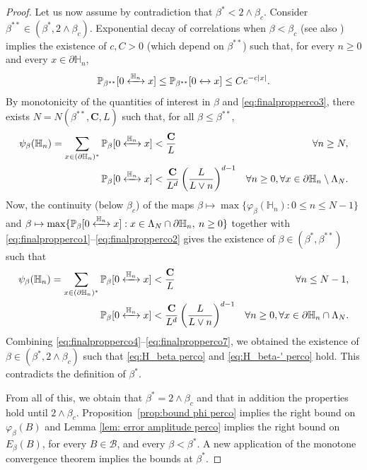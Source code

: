 \documentclass[11pt,a4paper]{article}
\numberwithin{equation}{section}
\theoremstyle{plain}
\theoremstyle{definition}
\newcommand\bfC{\mathbf{C}}
\newcommand{\connect}{\xleftrightarrow}
\begin{document}
\begin{proof}
Let us now assume by contradiction that $\beta^*<2\wedge\beta_c$. Consider $\beta^{**}\in (\beta^*,2\wedge \beta_c)$. Exponential decay of correlations when $\beta<\beta_c$ \cite{Mensikov1986coincidence,AizenmanBarsky1987sharpnessPerco} (see also \cite{DuminilTassionNewProofSharpness2016}) implies the existence of $c,C>0$ (which depend on $\beta^{**}$) such that, for every $n\geq 0$ and every  $x\in \mathbb \partial \mathbb H_n$,
\begin{equation}\label{eq:finalpropperco3}
	\mathbb P_{\beta^{**}}[0\connect{\mathbb H_n\:}x]\leq \mathbb P_{\beta^{**}}[0\connect{}x]\leq Ce^{-c|x|}.
\end{equation}
By monotonicity of the quantities of interest in $\beta$ and \eqref{eq:finalpropperco3}, there exists $N=N(\beta^{**},\bfC,L)$ such that, for all $\beta\leq \beta^{**}$, 
\begin{align}
\psi_{\beta}(\mathbb H_n)=\sum_{x\in (\partial\mathbb H_n)^*}\mathbb P_{\beta}[0\connect{\mathbb H_n\:}x]&<\frac{\bfC}{L}&\forall n\ge N,\label{eq:finalpropperco4}\\
\mathbb P_{\beta}[0\connect{\mathbb H_n\:}x]&< \frac{\bfC}{L^d}\left(\frac{L}{L\vee n}\right)^{d-1}&\forall n\geq 0,\forall x\in \partial\mathbb H_n\setminus \Lambda_N.\label{eq:finalpropperco5}
\end{align}
Now, the continuity (below $\beta_c$) of the maps $\beta\mapsto \max\{\varphi_\beta(\mathbb H_n): 0\leq n \leq N-1\}$ and $\beta\mapsto\max\{\mathbb P_\beta[0\connect{\mathbb H_n\:}x]: x\in \Lambda_N\cap \partial\mathbb H_n, \: n\geq 0\}$ together with \eqref{eq:finalpropperco1}--\eqref{eq:finalpropperco2} gives the existence of $\beta\in(\beta^*,\beta^{**})$ such that
\begin{align}
	\psi_{\beta}(\mathbb H_n)=\sum_{x\in (\partial\mathbb H_n)^*}\mathbb P_{\beta}[0\connect{\mathbb H_n\:}x]&<\frac{\bfC}{L}&\forall n\le N-1,\label{eq:finalpropperco6}\\
\mathbb P_{\beta}[0\connect{\mathbb H_n\:}x]&< \frac{\bfC}{L^d}\left(\frac{L}{L\vee n}\right)^{d-1}&\forall n\geq 0,\forall x\in \partial\mathbb H_n\cap \Lambda_N.\label{eq:finalpropperco7}
\end{align}
Combining \eqref{eq:finalpropperco4}--\eqref{eq:finalpropperco7}, we obtained the existence of $\beta\in (\beta^*,2\wedge \beta_c)$ such that \eqref{eq:H_beta perco} and \eqref{eq:H_beta-' perco} hold. This contradicts the definition of $\beta^*$. 

 From all of this, we obtain that $\beta^*=2\wedge\beta_c$ and that in addition the properties hold until $2 \wedge\beta_c$.  Proposition~\ref{prop:bound phi perco} implies the right bound on $\varphi_\beta(B)$ and Lemma \ref{lem: error amplitude perco} implies the right bound on $E_\beta(B)$, for every $B\in \mathcal B$, and every $\beta<\beta^*$. A new application of the monotone convergence theorem implies the bounds at $\beta^*$. 


\end{proof}
\end{document}
